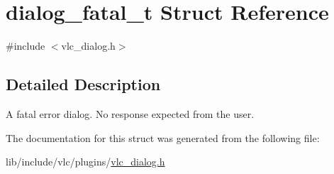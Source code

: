 \hypertarget{structdialog__fatal__t}{}\section{dialog\+\_\+fatal\+\_\+t Struct Reference}
\label{structdialog__fatal__t}


{\ttfamily \#include $<$vlc\+\_\+dialog.\+h$>$}



\subsection{Detailed Description}
A fatal error dialog. No response expected from the user. 

The documentation for this struct was generated from the following file\+:\begin{DoxyCompactItemize}
\item 
lib/include/vlc/plugins/\hyperlink{vlc__dialog_8h}{vlc\+\_\+dialog.\+h}\end{DoxyCompactItemize}

